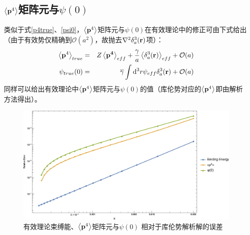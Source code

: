 \documentclass[hyperref,cs4size,titlepage,twoside]{ctexart}
\begin{document}
\subsection{$\expval{\vb{p}^4}$矩阵元与$\psi(0)$}
类似于式\eqref{p4true}、\eqref{psi0}，$\expval{\vb{p}^4}$矩阵元与$\psi(0)$在有效理论中的修正可由下式给出（由于有效势仅精确到$\mathcal{O}(a^2)$，故抛去$\laplacian{\delta^3_a(\vb{r})}$项）：
\begin{eqnarray}
  \expval{\vb{p}^4}_{true}&=&Z\expval{\vb{p^4}}_{eff}+\frac{\gamma}{a}\expval{\delta^3_a(\vb{r})}_{eff}+\mathcal{O}(a)\\
   \psi_{true}(0)&=&\overline{\gamma}\int\dd^3r\psi_{eff}\delta^3_a(\vb{r})+\mathcal{O}(a)
\end{eqnarray}
同样可以给出有效理论中$\expval{\vb{p}^4}$矩阵元与$\psi(0)$的值（库伦势对应的$\expval{\vb{p}^4}$即由解析方法得出）。
\begin{figure}[!htbp]
  \centering
  \includegraphics[width=6in]{Test_Coulomb_7.eps}
  \caption{有效理论束缚能、$\expval{\vb{p}^4}$矩阵元与$\psi(0)$ 相对于库伦势解析解的误差}
\end{figure}
\end{document}
